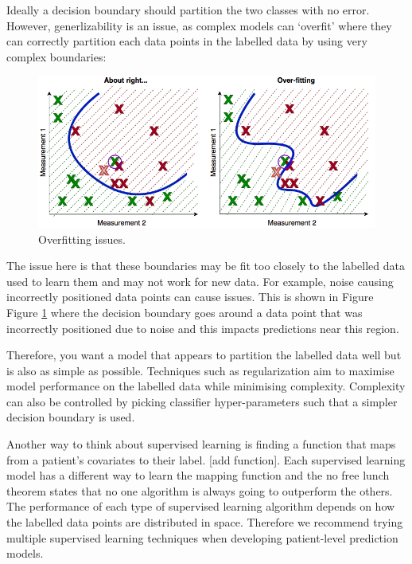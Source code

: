 \documentclass[11pt]{book}
\theoremstyle{definition}
\theoremstyle{definition}
\theoremstyle{definition}
\theoremstyle{remark}
\begin{document}
Ideally a decision boundary should partition the two classes with no error. However, generlizability is an issue, as complex models can `overfit' where they can correctly partition each data points in the labelled data by using very complex boundaries:

\begin{figure}
\includegraphics[width=1\linewidth]{images/PatientLevelPrediction/theory/noise} \caption{Overfitting issues.}\label{fig:figuretheory5}
\end{figure}

The issue here is that these boundaries may be fit too closely to the labelled data used to learn them and may not work for new data. For example, noise causing incorrectly positioned data points can cause issues. This is shown in Figure Figure \ref{fig:figuretheory5} where the decision boundary goes around a data point that was incorrectly positioned due to noise and this impacts predictions near this region.

Therefore, you want a model that appears to partition the labelled data well but is also as simple as possible. Techniques such as regularization aim to maximise model performance on the labelled data while minimising complexity. Complexity can also be controlled by picking classifier hyper-parameters such that a simpler decision boundary is used.

Another way to think about supervised learning is finding a function that maps from a patient's covariates to their label. {[}add function{]}. Each supervised learning model has a different way to learn the mapping function and the no free lunch theorem states that no one algorithm is always going to outperform the others. The performance of each type of supervised learning algorithm depends on how the labelled data points are distributed in space. Therefore we recommend trying multiple supervised learning techniques when developing patient-level prediction models.
\end{document}
